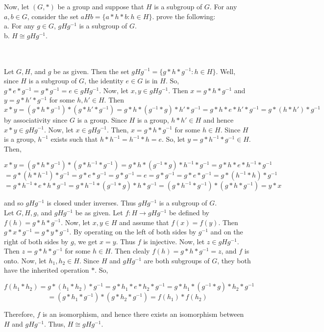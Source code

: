 Now, let $(G,*)$ be a group and suppose that $H$ is a subgroup of $G$. For any $a,b\in G$, consider
the set $aHb=\{a*h*b:h\in H\}$. prove the following:\\

a. For any $g\in G$, $gHg^{-1}$ is a subgroup of $G$.\\

b. $H\cong gHg^{-1}$.\\\\

\begin{solution}\renewcommand{\qedsymbol}{}\ \\
    Let $G, H$, and $g$ be as given. Then the set $gHg^{-1}=\{g*h*g^{-1}:h\in H\}$. Well, since $H$ is a
    subgroup of $G$, the identity $e\in G$ is in $H$. So, $g*e*g^{-1}=g*g^{-1}=e\in gHg^{-1}$. Now, let
    $x,y\in gHg^{-1}$. Then $x=g*h*g^{-1}$ and $y=g*h'*g^{-1}$ for some $h,h'\in H$. Then
    $x*y=(g*h*g^{-1})*(g*h'*g^{-1})=g*h*(g^{-1}*g)*h'*g^{-1}=g*h*e*h'*g^{-1}=g*(h*h')*g^{-1}$ by
    associativity since $G$ is a group. Since $H$ is a group, $h*h'\in H$ and hence $x*y\in gHg^{-1}$.
    Now, let $x\in gHg^{-1}.$ Then, $x=g*h*g^{-1}$ for some $h\in H$. Since $H$ is a group, $h^{-1}$
    exists such that $h*h^{-1}=h^{-1}*h=e$. So, let $y=g*h^{-1}*g^{-1}\in H$. Then,
    
    $$x*y=(g*h*g^{-1})*(g*h^{-1}*g^{-1})=g*h*(g^{-1}*g)*h^{-1}*g^{-1}=g*h*e*h^{-1}*g^{-1}$$
    $$=g*(h*h^{-1})*g^{-1}=g*e*g^{-1}=g*g^{-1}=e=g*g^{-1}=g*e*g^{-1}=g*(h^{-1}*h)*g^{-1}$$
    $$=g*h^{-1}*e*h*g^{-1}=g*h^{-1}*(g^{-1}*g)*h*g^{-1}=(g*h^{-1}*g^{-1})*(g*h*g^{-1})=y*x$$
    
    and so $gHg^{-1}$ is closed under inverses. Thus $gHg^{-1}$ is a subgroup of $G$.\\

    Let $G, H, g$, and $gHg^{-1}$ be as given. Let $f:H\rightarrow gHg^{-1}$ be defined by
    $f(h)=g*h*g^{-1}$. Now, let $x,y\in H$ and assume that $f(x)=f(y)$. Then $g*x*g^{-1}=g*y*g^{-1}$. By
    operating on the left of both sides by $g^{-1}$ and on the right of both sides by $g$, we get $x=y$.
    Thus $f$ is injective. Now, let $z\in gHg^{-1}$. Then $z=g*h*g^{-1}$ for some $h\in H$. Then clealy
    $f(h)=g*h*g^{-1}=z$, and $f$ is onto. Now, let $h_1,h_2\in H$. Since $H$ and $gHg^{-1}$ are both
    subgroups of $G$, they both have the inherited operation $*$. So,
    
    $$f(h_1*h_2)=g*(h_1*h_2)*g^{-1}=g*h_1*e*h_2*g^{-1}=g*h_1*(g^{-1}*g)*h_2*g^{-1}$$
    $$=(g*h_1*g^{-1})*(g*h_2*g^{-1})=f(h_1)*f(h_2)$$
    
    Therefore, $f$ is an isomorphism, and hence there exists an isomorphism between $H$ and $gHg^{-1}$.
    Thus, $H\cong gHg^{-1}$.

\end{solution}